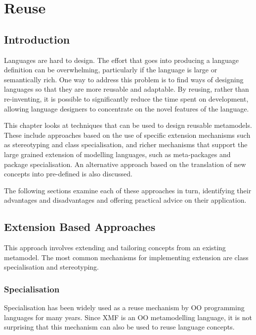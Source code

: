 \chapter{Reuse}
\label{langchapter}

\section{Introduction}

Languages are hard to design. The effort that goes into producing
a language definition can be overwhelming, particularly if the
language is large or semantically rich. One way to address this
problem is to find ways of designing languages so that they are
more reusable and adaptable. By reusing, rather than re-inventing,
it is possible to significantly reduce the time spent on
development, allowing language designers to concentrate on the
novel features of the language.

This chapter looks at techniques that can be used to design
reusable metamodels. These include approaches based on the use of
specific extension mechanisms such as stereotyping and class
specialisation, and richer mechanisms that support the large
grained extension of modelling languages, such as meta-packages
and package specialisation.  An alternative approach based on the
translation of new concepts into pre-defined is also discussed.

The following sections examine each of these approaches in turn,
identifying their advantages and disadvantages and offering
practical advice on their application.

\section{Extension Based Approaches}
\label{langextension}

This approach involves extending and tailoring concepts from an
existing metamodel. The most common mechanisms for implementing
extension are class specialisation and stereotyping.

\subsection{Specialisation}

Specialisation has been widely used as a reuse mechanism by OO
programming languages for many years. Since XMF is an OO
metamodelling language, it is not surprising that this mechanism
can also be used to reuse language concepts.


